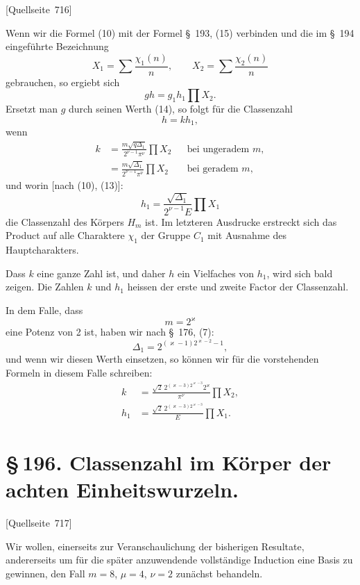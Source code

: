 \documentclass[11pt]{article}
\newcommand{\srcpage}[1]{\par\medskip\noindent\textsf{[Quellseite~#1]}\par\smallskip}
\begin{document}
\srcpage{716}
Wenn wir die Formel (10) mit der Formel \S~193, (15) verbinden und die im \S~194 eingeführte Bezeichnung
\[
X_1=\sum\frac{\chi_1(n)}{n},
\qquad
X_2=\sum\frac{\chi_2(n)}{n}
\]
gebrauchen, so ergiebt sich
\[
gh=g_1h_1\prod X_2.
\]
Ersetzt man $g$ durch seinen Werth (14), so folgt für die Classenzahl
\begin{equation}
h=kh_1,
\tag{15}
\end{equation}
wenn
\begin{equation}
\begin{aligned}
k&=\frac{m\sqrt{q\Delta_1}}{2^{\nu-1}\pi^\nu}\prod X_2 &&\text{bei ungeradem }m,\\
&=\frac{m\sqrt{\Delta_1}}{2^{\nu-1}\pi^\nu}\prod X_2 &&\text{bei geradem }m,
\end{aligned}
\tag{16}
\end{equation}
und worin [nach (10), (13)]:
\begin{equation}
h_1=\frac{\sqrt{\Delta_1}}{2^{\nu-1}E}\prod X_1
\tag{17}
\end{equation}
die Classenzahl des Körpers $H_m$ ist. Im letzteren Ausdrucke erstreckt sich das Product auf alle Charaktere $\chi_1$ der Gruppe $C_1$ mit Ausnahme des Hauptcharakters.

Dass $k$ eine ganze Zahl ist, und daher $h$ ein Vielfaches von $h_1$, wird sich bald zeigen. Die Zahlen $k$ und $h_1$ heissen der erste und zweite Factor der Classenzahl.

In dem Falle, dass
\[
m=2^\varkappa
\]
eine Potenz von 2 ist, haben wir nach \S~176, (7):
\[
\Delta_1=2^{(\varkappa-1)2^{\varkappa-2}-1},
\]
und wenn wir diesen Werth einsetzen, so können wir für die vorstehenden Formeln in diesem Falle schreiben:
\begin{equation}
\begin{aligned}
k&=\frac{\sqrt2\,2^{(\varkappa-3)2^{\varkappa-3}}2^\varkappa}{\pi^\nu}\prod X_2,\\
h_1&=\frac{\sqrt2\,2^{(\varkappa-3)2^{\varkappa-3}}}{E}\prod X_1.
\end{aligned}
\tag{18}
\end{equation}

\section*{\S\,196. Classenzahl im Körper der achten Einheitswurzeln.}

\srcpage{717}
Wir wollen, einerseits zur Veranschaulichung der bisherigen Resultate, andererseits um für die später anzuwendende vollständige Induction eine Basis zu gewinnen, den Fall $m=8$, $\mu=4$, $\nu=2$ zunächst behandeln.
\end{document}
